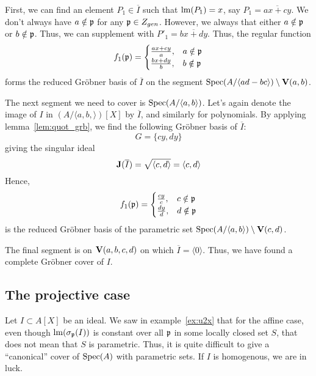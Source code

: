 \begin{example}
  First, we can find an element $P_{1} \in \overline I$ such that $\operatorname{lm}(P_{1}) = x$, say $P_{1} = \overline{ax + cy}$. We don't always have $a \notin \mathfrak p$ for any $\mathfrak p \in Z_{gen}$. However, we always that either $a \notin \mathfrak p$ or $b \notin \mathfrak p$. Thus, we can supplement with $P'_{1} = \overline{bx + dy}$. Thus, the regular function
  \[f_{1}(\mathfrak p) =
    \begin{cases}
      \frac{ax + cy}{a}, & a \notin \mathfrak p \\
      \frac{bx + dy}{b}, & b \notin \mathfrak p
    \end{cases}
  \]
  forms the reduced Gröbner basis of $\overline I$ on the segment $\operatorname{Spec}(A/\langle ad - bc \rangle) \setminus \operatorname{\mathbf V}(a, b)$.

  The next segment we need to cover is $\operatorname{Spec}(A/\langle a, b \rangle)$. Let's again denote the image of $I$ in $(A/\langle a, b, \rangle)[X]$ by $\overline I$, and similarly for polynomials. By applying lemma~\ref{lem:quot_grb}, we find the following Gröbner basis of $\overline I$:
  \[G = \{cy, dy\}\]
  giving the singular ideal
  \[\operatorname{\mathbf J}(\overline I) = \sqrt{\langle c, d \rangle} = \langle c, d \rangle\]
  Hence,
  \[f_{1}(\mathfrak p) =
    \begin{cases}
      \frac{cy}{c}, & c \notin \mathfrak p \\
      \frac{dy}{d}, & d \notin \mathfrak p
    \end{cases}
  \]
  is the reduced Gröbner basis of the parametric set $\operatorname{Spec}(A/\langle a, b \rangle) \setminus \operatorname{\mathbf V}(c, d)$.

  The final segment is on $\operatorname{\mathbf V}(a, b, c, d)$ on which $\overline I = \langle 0 \rangle$. Thus, we have found a complete Gröbner cover of $I$.
\end{example}














\subsection{The projective case}
Let $I \subset A[X]$ be an ideal. We saw in example~\ref{ex:u2x} that for the affine case, even though $\operatorname{lm}(\sigma_{\mathfrak p}(I))$ is constant over all $\mathfrak p$ in some locally closed set $S$, that does not mean that $S$ is parametric. Thus, it is quite difficult to give a ``canonical'' cover of $\operatorname{Spec}(A)$ with parametric sets. If $I$ is homogenous, we are in luck.

